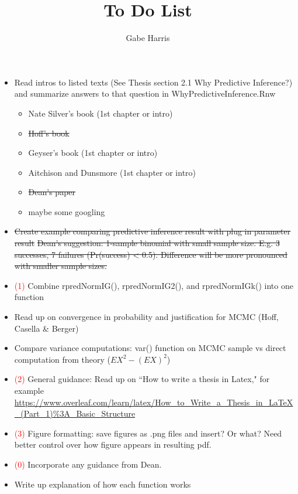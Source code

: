 \documentclass[12pt, a4paper]{article}
\begin{document}
% 
% 





\title{To Do List}
\author{\Large Gabe Harris}
\maketitle

\begin{itemize}
  \item Read intros to listed texts (See Thesis section 2.1 Why Predictive Inference?) and summarize answers to that question in WhyPredictiveInference.Rnw
    \begin{itemize}
      \item Nate Silver's book (1st chapter or intro)
      \item \sout{Hoff's book}
      \item Geyser's book (1st chapter or intro)
      \item Aitchison and Dunsmore (1st chapter or intro)
      \item \sout{Dean's paper}
      \item maybe some googling
    \end{itemize}
  \item \sout{Create example comparing predictive inference result with plug in parameter result}
    \subitem \sout{Dean's suggestion:  1-sample binomial with small sample size.  E.g. 3 successes, 7 failures (Pr(success) < 0.5).  Difference will be more pronounced with smaller sample sizes.}
  \item \textcolor{red}{(1)} Combine rpredNormIG(), rpredNormIG2(), and rpredNormIGk() into one function
  \item Read up on convergence in probability and justification for MCMC (Hoff, Casella \& Berger)
  \item Compare variance computations: var() function on MCMC sample vs direct computation from theory ($EX^2 - (EX)^2$)
  \item \textcolor{red}{(2)}  General guidance:  Read up on ``How to write a thesis in Latex," for example \url{https://www.overleaf.com/learn/latex/How_to_Write_a_Thesis_in_LaTeX_(Part_1)%3A_Basic_Structure}
  \item \textcolor{red}{(3)} Figure formatting:  save figures as .png files and insert?  Or what?  Need better control over how figure appears in resulting pdf.
  \item \textcolor{red}{(0)} Incorporate any guidance from Dean.
  \item Write up explanation of how each function works
\end{itemize}
\end{document}

